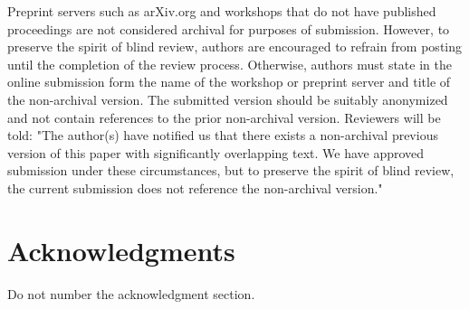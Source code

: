 Preprint servers such as arXiv.org and workshops that do not have published proceedings are not considered archival for purposes of submission. However, to preserve the spirit of blind review, authors are encouraged to refrain from posting until the completion of the review process. Otherwise, authors must state in the online submission form the name of the workshop or preprint server and title of the non-archival version. The submitted version should be suitably anonymized and not contain references to the prior non-archival version. Reviewers will be told: "The author(s) have notified us that there exists a non-archival previous version of this paper with significantly overlapping text. We have approved submission under these circumstances, but to preserve the spirit of blind review, the current submission does not reference the non-archival version."

\section*{Acknowledgments}

Do not number the acknowledgment section.